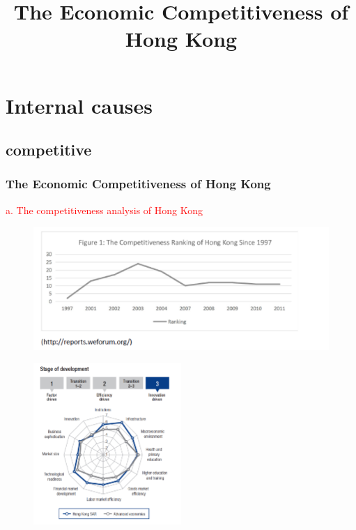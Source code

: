 \documentclass[slidestop,uncompress,mathsans, 12pt]{beamer}
\begin{document}
\section{Internal causes}
\subsection{competitive}
\begin{frame}

\title{The Economic Competitiveness of Hong Kong}
\date{}
\titlepage
\end{frame}
\begin{frame}
\frametitle{The Economic Competitiveness of Hong Kong}
\textcolor{red}{a. The competitiveness analysis of Hong Kong}\\
\begin{overprint}
\begin{figure}[h]
\centering
\includegraphics[width=1.1\textwidth]{hk4.jpg}
\label{threadsVsSync}
\end{figure}
\begin{figure}[h]
\centering
\includegraphics[width=0.5\textwidth]{hk17.png}
\label{threadsVsSync}
\end{figure}
\end{overprint}
\end{frame}
\end{document}
